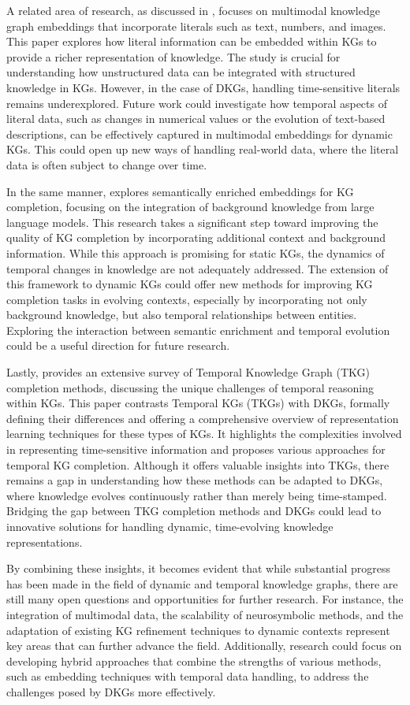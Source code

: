 A related area of research, as discussed in \cite{gesese2020}, focuses on multimodal knowledge graph embeddings that incorporate literals such as text, numbers, and images. 
This paper explores how literal information can be embedded within KGs to provide a richer representation of knowledge. The study is crucial for understanding how unstructured data can be 
integrated with structured knowledge in KGs. However, in the case of DKGs, handling time-sensitive literals remains underexplored. Future work could investigate how temporal aspects of literal 
data, such as changes in numerical values or the evolution of text-based descriptions, can be effectively captured in multimodal embeddings for dynamic KGs. This could open up new ways of 
handling real-world data, where the literal data is often subject to change over time.

In the same manner, \cite{alam2024semantical} explores semantically enriched embeddings for KG completion, focusing on the integration of background knowledge from large language models. 
This research takes a significant step toward improving the quality of KG completion by incorporating additional context and background information. While this approach is promising for 
static KGs, the dynamics of temporal changes in knowledge are not adequately addressed. The extension of this framework to dynamic KGs could offer new methods for improving KG completion tasks
in evolving contexts, especially by incorporating not only background knowledge, but also temporal relationships between entities. Exploring the interaction between semantic enrichment and 
temporal evolution could be a useful direction for future research.

Lastly, \cite{cai2023} provides an extensive survey of Temporal Knowledge Graph (TKG) completion methods, discussing the unique challenges of temporal reasoning within KGs. 
This paper contrasts Temporal KGs (TKGs) with DKGs, formally defining their differences and offering a comprehensive overview of representation learning techniques for these types of KGs. 
It highlights the complexities involved in representing time-sensitive information and proposes various approaches for temporal KG completion. Although it offers valuable insights into TKGs, 
there remains a gap in understanding how these methods can be adapted to DKGs, where knowledge evolves continuously rather than merely being time-stamped. Bridging the gap between TKG completion
methods and DKGs could lead to innovative solutions for handling dynamic, time-evolving knowledge representations.

By combining these insights, it becomes evident that while substantial progress has been made in the field of dynamic and temporal knowledge graphs, there are still many open questions and 
opportunities for further research. For instance, the integration of multimodal data, the scalability of neurosymbolic methods, and the adaptation of existing KG refinement techniques to dynamic
contexts represent key areas that can further advance the field. Additionally, research could focus on developing hybrid approaches that combine the strengths of various methods, such as 
embedding techniques with temporal data handling, to address the challenges posed by DKGs more effectively.